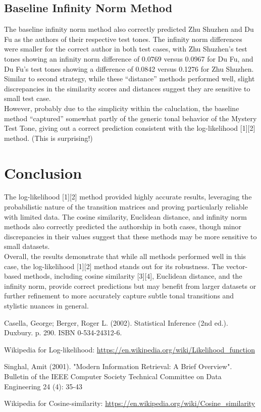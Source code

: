\documentclass[12pt]{article}
\begin{document}
\subsection*{Baseline Infinity Norm Method}
The baseline infinity norm method also correctly predicted Zhu Shuzhen and Du Fu as the authors of their respective test tones. The infinity norm differences were smaller for the correct author in both test cases, with Zhu Shuzhen's test tones showing an infinity norm difference of 0.0769 versus 0.0967 for Du Fu, and Du Fu's test tones showing a difference of 0.0842 versus 0.1276 for Zhu Shuzhen.
\\
Similar to second strategy, while these ``distance'' methods performed well, slight discrepancies in the similarity scores and distances suggest they are sensitive to small test case.
\\
However, probably due to the simplicity within the caluclation, the baseline method ``captured'' somewhat partly of the generic tonal behavior of the Mystery Test Tone, giving out a correct prediction consistent with the log-likelihood [1][2] method. (This is surprising!) 

\section{Conclusion}
The log-likelihood [1][2] method provided highly accurate results, leveraging the probabilistic nature of the transition matrices and proving particularly reliable with limited data. The cosine similarity, Euclidean distance, and infinity norm methods also correctly predicted the authorship in both cases, though minor discrepancies in their values suggest that these methods may be more sensitive to small datasets.
\\
Overall, the results demonstrate that while all methods performed well in this case, the log-likelihood [1][2] method stands out for its robustness. The vector-based methods, including cosine similarity [3][4], Euclidean distance, and the infinity norm, provide correct predictions but may benefit from larger datasets or further refinement to more accurately capture subtle tonal transitions and stylistic nuances in general.

\begin{thebibliography}{99}

     Casella, George; Berger, Roger L. (2002). Statistical Inference (2nd ed.). Duxbury. p. 290. ISBN 0-534-24312-6.

     Wikipedia for Log-likelihood: \url{https://en.wikipedia.org/wiki/Likelihood_function}

     Singhal, Amit (2001). "Modern Information Retrieval: A Brief Overview". Bulletin of the IEEE Computer Society Technical Committee on Data Engineering 24 (4): 35-43

     Wikipedia for Cosine-similarity: \url{https://en.wikipedia.org/wiki/Cosine_similarity}

\end{thebibliography}
\end{document}
